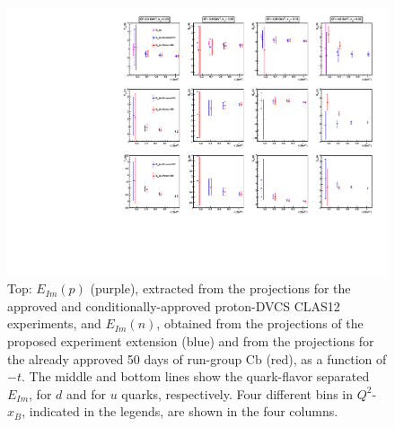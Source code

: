 \begin{figure}  
\begin{center}
\includegraphics[width=160mm]{flavors_e_im_compare3.pdf}
\caption[Flavor separation of the $E_{Im}$ CFF]
{Top: ${E}_{Im}(p)$ (purple), extracted from the projections for the approved and conditionally-approved proton-DVCS CLAS12 experiments, and ${E}_{Im}(n)$, obtained from the projections of the proposed experiment extension (blue) and from the projections for the already approved 50 days of run-group Cb (red), as a function of $-t$. The middle and bottom lines show the quark-flavor separated ${E}_{Im}$, for $d$ and for $u$ quarks, respectively. Four different bins in $Q^2$-$x_B$, indicated in the legends, are shown in the four columns.}\label{flavor_e_im}
\end{center}
\end{figure}

